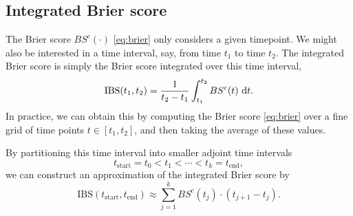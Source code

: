 \subsection{Integrated Brier score}
The Brier score $BS^c(\cdot)$ \eqref{eq:brier} only considers a given timepoint.
We might also be interested in a time interval, say, from time $t_1$ to time $t_2$.
The integrated Brier score is simply the Brier score integrated over this time interval,
\begin{equation*}
    \text{IBS}(t_1, t_2)=\frac{1}{t_2-t_1}\int_{t_1}^{t_2}BS^c(t)~\text{d} t.
\end{equation*}
In practice, we can obtain this by computing the Brier score \ref{eq:brier} over a fine grid of time points $t\in[t_1,t_2]$, and then taking the average of these values.

By partitioning this time interval into smaller adjoint time intervals
\begin{equation*}
    t_{\text{start}}=t_0<t_1<\cdots<t_k=t_{\text{end}},
\end{equation*}
we can construct an approximation of the integrated Brier score by
\begin{equation*}
    \text{IBS}(t_{\text{start}}, t_{\text{end}})\approx\sum_{j=1}^k BS^c(t_j)\cdot(t_{j+1}-t_{j}).
\end{equation*}
